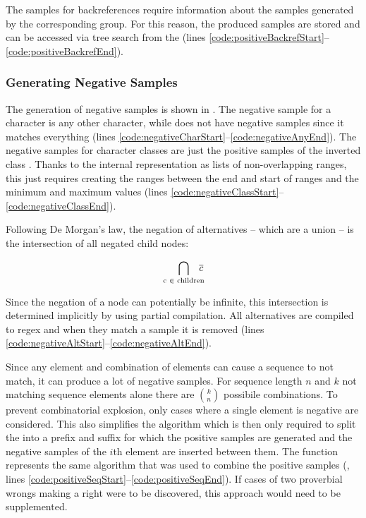 The samples for backreferences require information about the samples generated by the corresponding group. For this reason, the produced samples are stored and can be accessed via tree search from the  (lines \ref{code:positiveBackrefStart}--\ref{code:positiveBackrefEnd}).

\FloatBarrier
\subsubsection{Generating Negative Samples}

The generation of negative samples is shown in . The negative sample for a character is any other character, while  does not have negative samples since it matches everything (lines \ref{code:negativeCharStart}--\ref{code:negativeAnyEnd}). The negative samples for character classes are just the positive samples of the inverted class . Thanks to the internal representation as lists of non-overlapping ranges, this just requires creating the ranges between the end and start of ranges and the minimum and maximum values (lines \ref{code:negativeClassStart}--\ref{code:negativeClassEnd}).

Following De Morgan's law, the negation of alternatives -- which are a union -- is the intersection of all negated child nodes:

\vspace{-1em}
\begin{equation*}
    \bigcap_{\text{c } \in \text{ children}} \hspace{-.7em}\overline{c}
\end{equation*}
\vspace{-1em}

Since the negation of a node can potentially be infinite, this intersection is determined implicitly by using partial compilation. All alternatives are compiled to regex and when they match a sample it is removed (lines \ref{code:negativeAltStart}--\ref{code:negativeAltEnd}).

Since any element and combination of elements can cause a sequence to not match, it can produce a lot of negative samples. For sequence length $n$ and $k$ not matching sequence elements alone there are ${k}\choose{n}$ possibile combinations. To prevent combinatorial explosion, only cases where a single element is negative are considered. This also simplifies the algorithm which is then only required to split the  into a prefix and suffix for which the positive samples are generated and the negative samples of the $i$th element are inserted between them. The function  represents the same algorithm that was used to combine the positive samples (, lines \ref{code:positiveSeqStart}--\ref{code:positiveSeqEnd}). If cases of two proverbial wrongs making a right were to be discovered, this approach would need to be supplemented.

